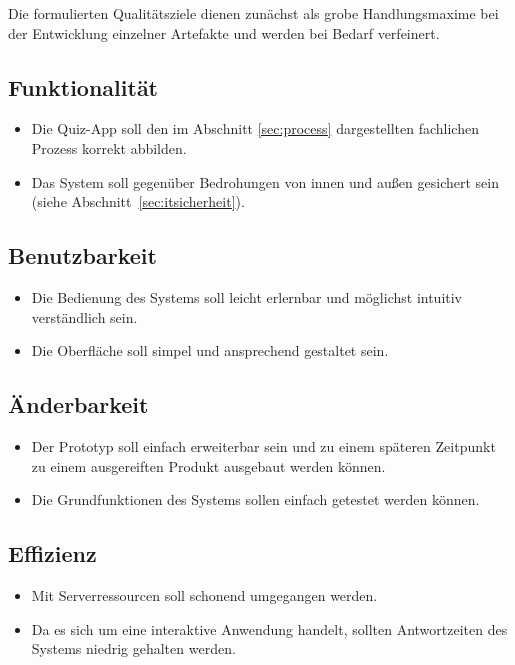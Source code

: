\documentclass[a4paper,11pt,listof=numbered,glossary=totoc,parskip=half,toc=bib]{scrreprt}
\begin{document}
	Die formulierten Qualitätsziele dienen zunächst als grobe Handlungsmaxime bei der Entwicklung einzelner Artefakte und werden bei Bedarf verfeinert.
	
	\subsection{Funktionalität}
	
	\begin{itemize}
		\item Die Quiz-App soll den im Abschnitt \ref{sec:process} dargestellten fachlichen Prozess korrekt abbilden.
		\item Das System soll gegenüber Bedrohungen von innen und außen gesichert sein (siehe Abschnitt~\ref{sec:itsicherheit}).		
	\end{itemize}
	
	\subsection{Benutzbarkeit}
	\begin{itemize}
		\item Die Bedienung des Systems soll leicht erlernbar und möglichst intuitiv verständlich sein.
		\item Die Oberfläche soll simpel und ansprechend gestaltet sein.
	\end{itemize}
	
	\subsection{Änderbarkeit}
	\begin{itemize}
		\item Der Prototyp soll einfach erweiterbar sein und zu einem späteren Zeitpunkt zu einem ausgereiften Produkt ausgebaut werden können.
		\item Die Grundfunktionen des Systems sollen einfach getestet werden können.
	\end{itemize}
	
	\subsection{Effizienz}
	\begin{itemize}
		\item Mit Serverressourcen soll schonend umgegangen werden.
		\item Da es sich um eine interaktive Anwendung handelt, sollten Antwortzeiten des Systems niedrig gehalten werden.
	\end{itemize}
	
\end{document}

